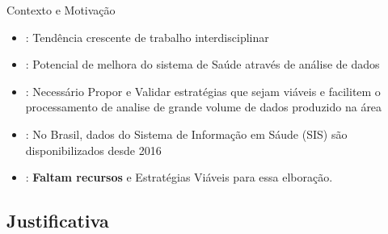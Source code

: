 \documentclass[10pt,brazil]{beamer}
\theoremstyle{definition}
\begin{document}
\begin{frame}[t,allowframebreaks]{Contexto e Motivação}
\begin{itemize}
    \item: Tendência crescente de trabalho interdisciplinar
    \item: Potencial de melhora do sistema de Saúde através de análise de dados
    \item: Necessário Propor e Validar estratégias que sejam viáveis e facilitem o processamento de analise de grande volume de dados produzido na área
  \end{itemize}
  \framebreak
  \begin{itemize}
    \item: No Brasil, dados do Sistema de Informação em Sáude (SIS) são disponibilizados desde 2016
    \item: \textbf{Faltam recursos} e Estratégias Viáveis para essa elboração.
  \end{itemize}
\end{frame}



\subsection{Justificativa}
\end{document}
